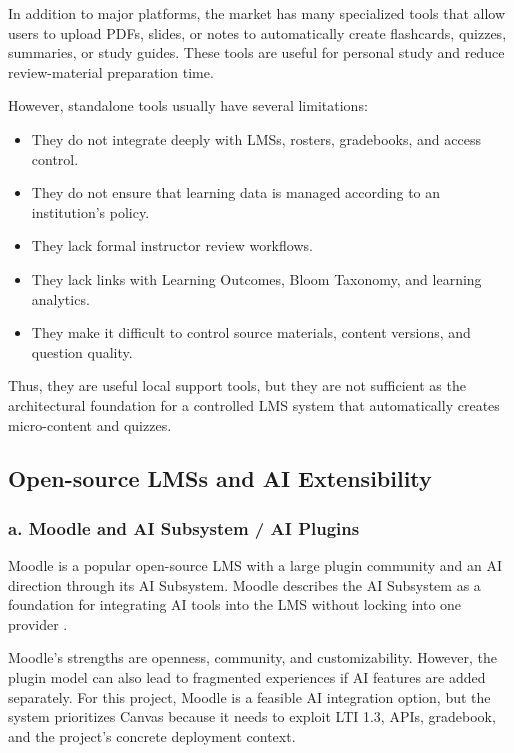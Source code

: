 In addition to major platforms, the market has many specialized tools that
allow users to upload PDFs, slides, or notes to automatically create
flashcards, quizzes, summaries, or study guides. These tools are useful for
personal study and reduce review-material preparation time.

However, standalone tools usually have several limitations:

\begin{itemize}
    \item They do not integrate deeply with LMSs, rosters, gradebooks, and
          access control.
    \item They do not ensure that learning data is managed according to an
          institution's policy.
    \item They lack formal instructor review workflows.
    \item They lack links with Learning Outcomes, Bloom Taxonomy, and learning
          analytics.
    \item They make it difficult to control source materials, content versions,
          and question quality.
\end{itemize}

Thus, they are useful local support tools, but they are not sufficient as the
architectural foundation for a controlled LMS system that automatically creates
micro-content and quizzes.

\subsection{Open-source LMSs and AI Extensibility}

\subsubsection*{a. Moodle and AI Subsystem / AI Plugins}

Moodle is a popular open-source LMS with a large plugin community and an AI
direction through its AI Subsystem. Moodle describes the AI Subsystem as a
foundation for integrating AI tools into the LMS without locking into one
provider \cite{moodle-ai}.

Moodle's strengths are openness, community, and customizability. However, the
plugin model can also lead to fragmented experiences if AI features are added
separately. For this project, Moodle is a feasible AI integration option, but
the system prioritizes Canvas because it needs to exploit LTI 1.3, APIs,
gradebook, and the project's concrete deployment context.

